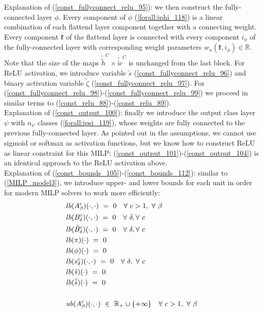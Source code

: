 \documentclass{article}
\begin{document}
{Explanation of (\ref{const_fullyconnect_relu_95}): we then construct the fully-connected layer $\phi$. Every component of $\phi$ (\ref{forall:iphi_118}) is a linear combination of each flattend layer component together with a connecting weight. Every component $\mathfrak{k}$ of the flattend layer is connected with every component $i_\phi$ of the fully-connected layer with corresponding weight parameters $w_\pi(\mathfrak{k}, i_\phi) \in \mathbb{R}$. Note that the size of the maps $\tilde{\tilde{h}}^{C} \times \tilde{\tilde{w}}^{C}$ is unchanged from the last block. For ReLU activation, we introduce variable $\tilde{s}$ (\ref{const_fullyconnect_relu_96}) and binary activation variable $\tilde{\zeta}$ (\ref{const_fullyconnect_relu_97}). For (\ref{const_fullyconnect_relu_98})-(\ref{const_fullyconnect_relu_99}) we proceed in similar terms to (\ref{const_relu_88})-(\ref{const_relu_89}).\\
Explanation of (\ref{const_output_100}): finally we introduce the output class layer $\psi$ with $n_\psi$ classes (\ref{forall:ipsi_119}), whose weights are fully connected to the previous fully-connected layer. As pointed out in the assumptions, we cannot use sigmoid or softmax as activation functions, but we know how to construct ReLU as linear constraint for this MILP: (\ref{const_output_101})-(\ref{const_output_104}) is an identical approach to the ReLU activation above.\\
Explanation of (\ref{const_bounds_105})-(\ref{const_bounds_112}): similar to (\ref{MILP_model3}), we introduce upper- and lower bounds for each unit in order for modern MILP solvers to work more efficiently:
\begin{align}
&lb(A_\beta^c)(\cdot, \cdot) \ = \ 0 \quad \forall \ c>1, \ \forall \ \beta \\
&lb(B_\delta^c)(\cdot, \cdot) \ = \ 0 \quad \forall \ \delta, \forall \ c \\
&lb(\hat{B}_\delta^c)(\cdot, \cdot) \ = \ 0 \quad \forall \ \delta, \forall \ c \\ 
&lb(\pi)(\cdot) \ = \ 0 \\
&lb(\phi)(\cdot) \ = \ 0 \\
&lb(s_\delta^c)(\cdot, \cdot) \ = \ 0 \quad \forall \ \delta, \ \forall \ c \\
&lb(\tilde{s})(\cdot) \ = \ 0 \\
&lb(\tilde{\tilde{s}})(\cdot) \ = \ 0 \\
\notag \\
&ub(A_\beta^c)(\cdot, \cdot) \ \in \ \mathbb{R}_+ \cup \{+\infty\} \quad \forall \ c>1, \ \forall \ \beta \\

\end{align}}
\end{document}
